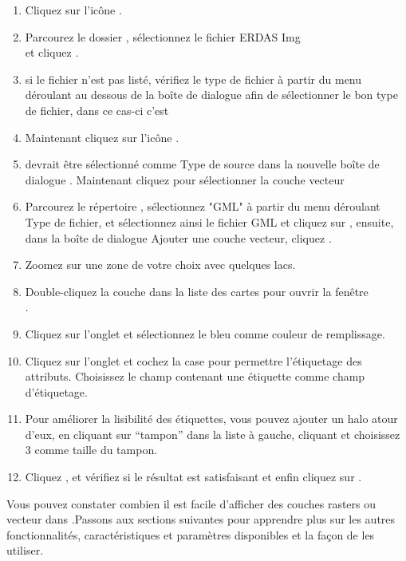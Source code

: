 \begin{enumerate}[itemsep=2pt]
\item Cliquez sur l'icône .
\item Parcourez le dossier , sélectionnez 
le fichier ERDAS Img\\
  et cliquez .
\item si le fichier n'est pas listé, vérifiez le type de fichier à partir du menu déroulant 
au dessous de la boîte de dialogue afin de sélectionner le bon type de fichier, dans ce cas-ci c'est 
\item Maintenant cliquez sur l'icône . 
\item {} devrait être sélectionné comme Type de source dans la nouvelle boîte de dialogue 
. Maintenant cliquez  pour sélectionner la couche vecteur
\item Parcourez le répertoire , sélectionnez "GML"
à partir du menu déroulant Type de fichier, et sélectionnez ainsi le fichier GML  
et cliquez sur , ensuite, dans la boîte de dialogue Ajouter une couche vecteur, cliquez .
\item Zoomez sur une zone de votre choix avec quelques lacs.
\item Double-cliquez la couche  dans la liste des cartes pour ouvrir la fenêtre\\ .
\item Cliquez sur l'onglet  et sélectionnez le bleu comme couleur de remplissage.
\item Cliquez sur l'onglet  et cochez la case  pour permettre l'étiquetage des attributs. 
Choisissez le champ contenant une étiquette comme champ d'étiquetage.
\item Pour améliorer la lisibilité des étiquettes, vous pouvez ajouter un halo atour d'eux,
en cliquant sur ``tampon'' dans la liste à gauche, cliquant  et choisissez 3 comme taille du tampon.
\item Cliquez , et vérifiez si le résultat est satisfaisant et enfin cliquez sur .
\end{enumerate} 

Vous pouvez constater combien il est facile d'afficher des couches rasters ou vecteur dans \qg.Passons aux sections suivantes pour apprendre plus sur les autres fonctionnalités, caractéristiques et paramètres disponibles et la façon de les utiliser.